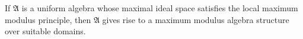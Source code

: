 
If $\mathfrak{A}$ is a uniform algebra whose maximal ideal space satisfies the local maximum modulus principle, then $\mathfrak{A}$ gives rise to a maximum modulus algebra structure over suitable domains.
